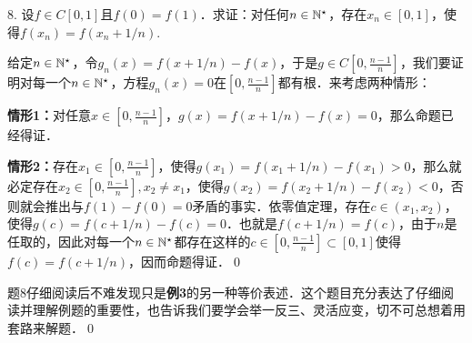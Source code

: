 8. 设$f \in C[0,1]$且$f(0)=f(1)$．求证：对任何$n \in \mathbb{N}^\star$，存在$x_n \in [0,1]$，使得$f(x_n) = f(x_n + 1/n)$.

\prove 给定$n \in \mathbb{N}^\star$，令$g_n(x) = f(x + 1/n) - f(x)$，于是$g \in C[0,\displaystyle\frac{n-1}{n}]$，我们要证明对每一个$n \in \mathbb{N}^\star$，方程$g_n(x) = 0$在$[0,\displaystyle\frac{n-1}{n}]$都有根．来考虑两种情形：

\textbf{情形1：}对任意$x \in [0, \displaystyle\frac{n-1}{n}]$，$g(x) = f(x+1/n)-f(x)=0$，那么命题已经得证．

\textbf{情形2：}存在$x_1 \in [0, \displaystyle\frac{n-1}{n}]$，使得$g(x_1) = f(x_1+1/n)-f(x_1)>0$，那么就必定存在$x_2 \in [0, \displaystyle\frac{n-1}{n}], x_2 \neq x_1$，使得$g(x_2) = f(x_2+1/n)-f(x_2)<0$，否则就会推出与$f(1)-f(0)=0$矛盾的事实．依零值定理，存在$c \in (x_1,x_2)$，使得$g(c)=f(c+1/n)-f(c)=0$．也就是$f(c+1/n)=f(c)$，由于$n$是任取的，因此对每一个$n \in \mathbb{N}^\star$都存在这样的$c \in [0,\displaystyle\frac{n-1}{n}]\subset[0,1]$使得$f(c)=f(c+1/n)$，因而命题得证．\qed\bigskip

\annotate 题8仔细阅读后不难发现只是\textbf{例3}的另一种等价表述．这个题目充分表达了仔细阅读并理解例题的重要性，也告诉我们要学会举一反三、灵活应变，切不可总想着用套路来解题．\qed\bigskip